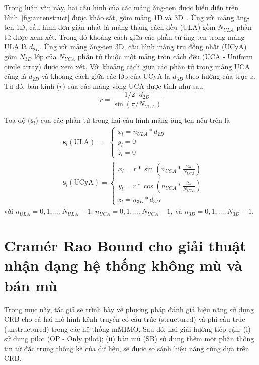 Trong luận văn này, hai cấu hình của các mảng ăng-ten được biểu diễn trên hình~\ref{fig:antenstruct} được khảo sát, gồm mảng 1D và 3D~\cite{POORMOHAMMAD2017}. Ứng với mảng ăng-ten 1D, cấu hình đơn giản nhất là mảng thẳng cách đều (ULA) gồm $N_{ULA}$ phần tử được xem xét. Trong đó khoảng cách giữa các phần tử ăng-ten trong mảng ULA là $d_{2D}$. Ứng với mảng ăng-ten 3D, cấu hình mảng trụ đồng nhất (UCyA) gồm $N_{3D}$ lớp của $N_{UCA}$ phần tử thuộc một mảng tròn cách đều (UCA - Uniform circle array) được xem xét. Với khoảng cách giữa các phần tử trong mảng UCA cũng là $d_{2D}$ và khoảng cách giữa các lớp của UCyA là $d_{3D}$ theo hướng của trục $z$. Từ đó, bán kính ($r$) của các mảng vòng UCA được tính như sau
\begin{equation}
    r = \frac{1/2 \cdot d_{2D}}{\sin(\pi/N_{UCA})}
\end{equation}

Toạ độ ($\boldsymbol{s}_l$) của các phần tử trong hai cấu hình mảng ăng-ten nêu trên là
\begin{align} 
    &\boldsymbol{s}_l(\text{ULA}) = \;\; \begin{cases}
    x_l = n_{ULA} * d_{2D}\\ 
    y_l = 0\\ 
    z_l = 0
    \end{cases}
    \\
    &\boldsymbol{s}_l(\text{UCyA}) = \begin{cases}
    x_l = r * \sin(n_{UCA} * \frac{2\pi}{N_{UCA}})\\ 
    y_l = r * \cos(n_{UCA} * \frac{2\pi}{N_{UCA}})\\ 
    z_l = n_{3D} * d_{3D}
    \end{cases}
\end{align}
với $n_{ULA} = 0, 1, \ldots, N_{ULA}-1$; $n_{UCA} = 0, 1, \ldots, N_{UCA}-1$, và $n_{3D} = 0, 1, \ldots, N_{3D}-1$.


\section{Cramér Rao Bound cho giải thuật nhận dạng hệ thống không mù và bán mù}\label{CRB}

Trong mục này, tác giả sẽ trình bày về phương pháp đánh giá hiệu năng sử dụng CRB cho cả hai mô hình kênh truyền có cấu trúc (structured) và phi cấu trúc (unstructured) trong các hệ thống mMIMO. Sau đó, hai giải hướng tiếp cận: (i) sử dụng pilot (OP - Only pilot); (ii) bán mù (SB) sử dụng thêm một phần thông tin từ đặc trưng thống kê của dữ liệu, sẽ được so sánh hiệu năng cũng dựa trên CRB. 
